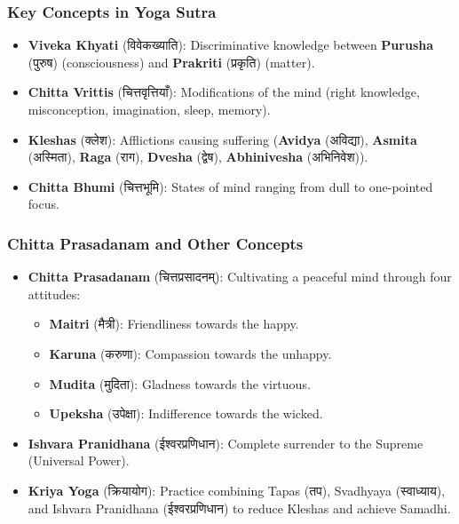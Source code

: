 \begin{frame}[fragile]\frametitle{Key Concepts in Yoga Sutra}
    \begin{itemize}
        \item \textbf{Viveka Khyati} (विवेकख्याति): Discriminative knowledge between \textbf{Purusha} (पुरुष) (consciousness) and \textbf{Prakriti} (प्रकृति) (matter).
        \item \textbf{Chitta Vrittis} (चित्तवृत्तियाँ): Modifications of the mind (right knowledge, misconception, imagination, sleep, memory).
        \item \textbf{Kleshas} (क्लेश): Afflictions causing suffering (\textbf{Avidya} (अविद्या), \textbf{Asmita} (अस्मिता), \textbf{Raga} (राग), \textbf{Dvesha} (द्वेष), \textbf{Abhinivesha} (अभिनिवेश)).
        \item \textbf{Chitta Bhumi} (चित्तभूमि): States of mind ranging from dull to one-pointed focus.
    \end{itemize}
\end{frame}

\begin{frame}[fragile]\frametitle{Chitta Prasadanam and Other Concepts}
    \begin{itemize}
        \item \textbf{Chitta Prasadanam} (चित्तप्रसादनम्): Cultivating a peaceful mind through four attitudes:
        \begin{itemize}
            \item \textbf{Maitri} (मैत्री): Friendliness towards the happy.
            \item \textbf{Karuna} (करुणा): Compassion towards the unhappy.
            \item \textbf{Mudita} (मुदिता): Gladness towards the virtuous.
            \item \textbf{Upeksha} (उपेक्षा): Indifference towards the wicked.
        \end{itemize}
        \item \textbf{Ishvara Pranidhana} (ईश्वरप्रणिधान): Complete surrender to the Supreme (Universal Power).
        \item \textbf{Kriya Yoga} (क्रियायोग): Practice combining Tapas (तप), Svadhyaya (स्वाध्याय), and Ishvara Pranidhana (ईश्वरप्रणिधान) to reduce Kleshas and achieve Samadhi.
    \end{itemize}
\end{frame}

